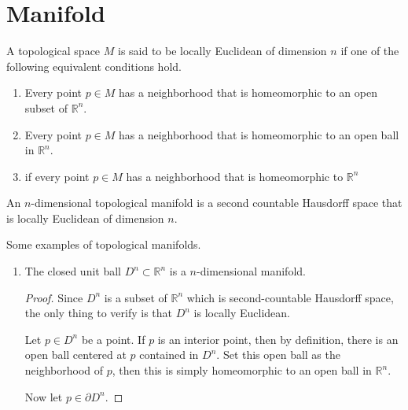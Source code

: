 \chapter{Manifold}

\begin{defbox}
    \begin{definition}
        A topological space \(M\) is said to be locally Euclidean of dimension \(n\) if one of the following equivalent conditions hold.
        \begin{enumerate}
            \item Every point \(p \in M\) has a neighborhood that is homeomorphic to an open subset of \(\mathbb{R}^n\).
            \item Every point \(p \in M\) has a neighborhood that is homeomorphic to an open ball in \(\mathbb{R}^n\).
            \item if every point \(p \in M\) has a neighborhood that is homeomorphic to \(\mathbb{R}^n\)
        \end{enumerate}
    \end{definition}
\end{defbox}

\begin{defbox}
    \begin{definition}
        An \(n\)-dimensional topological manifold is a second countable Hausdorff space that is locally Euclidean of dimension \(n\).
    \end{definition}
\end{defbox}

\begin{example}
    Some examples of topological manifolds.
    \begin{enumerate}
        \item The closed unit ball \(D^n \subset \mathbb{R}^n\) is a \(n\)-dimensional manifold.
        \begin{proof}
            Since \(D^n\) is a subset of \(\mathbb{R}^n\) which is second-countable Hausdorff space, the only thing to verify is that \(D^n\) is locally Euclidean.

            Let \(p \in D^n\) be a point. If \(p\) is an interior point, then by definition, there is an open ball centered at \(p\) contained in \(D^n\). Set this open ball as the neighborhood of \(p\), then this is simply homeomorphic to an open ball in \(\mathbb{R}^n\).

            Now let \(p \in \partial D^n\).
        \end{proof}
    \end{enumerate}
\end{example}